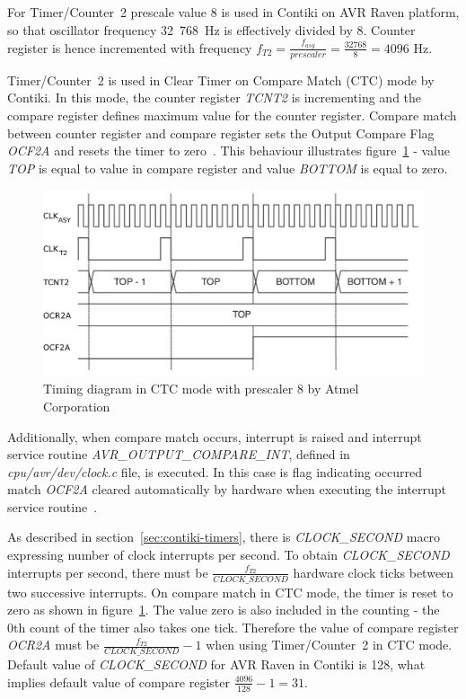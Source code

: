 For Timer/Counter~2 prescale value 8 is used in Contiki on AVR Raven platform,
so that oscillator frequency 32~768~Hz is effectively divided by 8.
Counter register is hence incremented with frequency
$f_{T2} = {\frac{f_{asy}}{prescaler}} = {\frac{32768}{8}} = 4096$ Hz.

Timer/Counter~2 is used in Clear Timer on Compare Match (CTC) mode by Contiki.
In this mode, the counter register {\it{TCNT2}} is incrementing
and the compare register defines maximum value for the counter register.
Compare match between counter register and compare register
sets the Output Compare Flag {\it{OCF2A}} and resets the timer to zero~\cite{avr-datasheet}.
This behaviour illustrates figure~\ref{fig:design-timing-diagram}
- value {\it{TOP}} is equal to value in compare register and value {\it{BOTTOM}} is equal to zero.

\begin{figure}
  \centering
  \includegraphics[width=12cm,keepaspectratio]{fig/timing-diagram.pdf}
  \caption{Timing diagram in CTC mode with prescaler 8 by Atmel Corporation}
  \label{fig:design-timing-diagram}
  \bigskip
\end{figure}

Additionally, when compare match occurs,
interrupt is raised and interrupt service routine {\it{AVR\_OUTPUT\_COMPARE\_INT}},
defined in {\it{cpu/avr/dev/clock.c}} file, is executed.
In this case is flag indicating occurred match {\it{OCF2A}}
cleared automatically by hardware when executing
the interrupt service routine~\cite{avr-datasheet}.

As described in section~\ref{sec:contiki-timers}, there is
{\it{CLOCK\_SECOND}} macro expressing number of clock interrupts per second.
To obtain {\it{CLOCK\_SECOND}} interrupts per second, there must be
${\frac{f_{T2}}{CLOCK\_SECOND}}$ hardware clock ticks between two successive interrupts.
On compare match in CTC mode, the timer is reset to zero as
shown in figure~\ref{fig:design-timing-diagram}.
The value zero is also included in the counting - the 0th count of the timer also takes one tick.
Therefore the value of compare register {\it{OCR2A}} must be ${\frac{f_{T2}}{CLOCK\_SECOND}} - 1$
when using Timer/Counter~2 in CTC mode.
Default value of {\it{CLOCK\_SECOND}} for AVR Raven in Contiki is 128,
what implies default value of compare register ${\frac{4096}{128}} - 1 = 31$.

